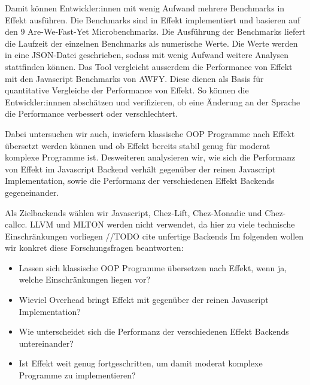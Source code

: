 Damit können Entwickler:innen mit wenig Aufwand mehrere Benchmarks in Effekt ausführen.
Die Benchmarks sind in Effekt implementiert und basieren auf den 9 Are-We-Fast-Yet Microbenchmarks.
Die Ausführung der Benchmarks liefert die Laufzeit der einzelnen Benchmarks als numerische Werte. Die Werte werden in eine JSON-Datei geschrieben, sodass mit wenig Aufwand weitere Analysen stattfinden können.
Das Tool vergleicht ausserdem die Performance von Effekt mit den Javascript Benchmarks von AWFY. Diese dienen als Basis für quantitative Vergleiche der Performance von Effekt.
So können die Entwickler:innnen abschätzen und verifizieren, ob eine Änderung an der Sprache die Performance verbessert oder verschlechtert.

\medskip
Dabei untersuchen wir auch, inwiefern klassische OOP Programme nach Effekt übersetzt werden können und ob Effekt bereits stabil genug für moderat komplexe Programme ist.  
Desweiteren analysieren wir, wie sich die Performanz von Effekt im Javascript Backend verhält gegenüber der reinen Javascript Implementation, sowie die Performanz der verschiedenen Effekt Backends gegeneinander.

\medskip
Als Zielbackends wählen wir Javascript, Chez-Lift, Chez-Monadic und Chez-callcc.
LLVM und MLTON werden nicht verwendet, da hier zu viele technische Einschränkungen vorliegen //TODO cite unfertige Backends
\medskip
Im folgenden wollen wir konkret diese Forschungsfragen beantworten:
\begin{itemize}
    \item Lassen sich klassische OOP Programme übersetzen nach Effekt, wenn ja, welche Einschränkungen liegen vor?
    \item Wieviel Overhead bringt Effekt mit gegenüber der reinen Javascript Implementation?
    \item Wie unterscheidet sich die Performanz der verschiedenen Effekt Backends untereinander?
    \item Ist Effekt weit genug fortgeschritten, um damit moderat komplexe Programme zu implementieren?
\end{itemize}


  